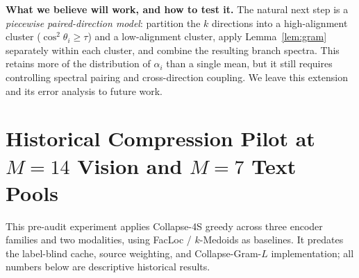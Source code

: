 \documentclass{article}
\begin{document}
\textbf{What we believe will work, and how to test it.}
The natural next step is a \emph{piecewise paired-direction model}:
partition the $k$ directions into a high-alignment cluster
($\cos^2\theta_i{\geq}\tau$) and a low-alignment cluster, apply
Lemma~\ref{lem:gram} separately within each cluster, and combine the
resulting branch spectra.  This retains more of the distribution of
$\alpha_i$ than a single mean, but it still requires controlling spectral
pairing and cross-direction coupling.  We leave this extension and its
error analysis to future work.

\section{Historical Compression Pilot at $M{=}14$ Vision and $M{=}7$ Text Pools}
\label{app:compression_m14}

This pre-audit experiment applies Collapse-4S greedy across three encoder
families and two modalities, using FacLoc / $k$-Medoids as baselines.  It
predates the label-blind cache, source weighting, and Collapse-Gram-$L$
implementation; all numbers below are descriptive historical results.
\end{document}
